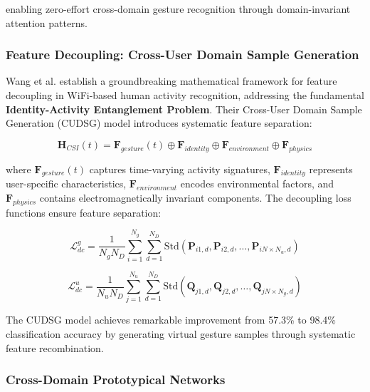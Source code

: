 \documentclass[journal]{IEEEtran}
\begin{document}
{enabling zero-effort cross-domain gesture recognition through domain-invariant attention patterns.

\subsubsection{Feature Decoupling: Cross-User Domain Sample Generation}

Wang et al. \cite{wang2024feature} establish a groundbreaking mathematical framework for feature decoupling in WiFi-based human activity recognition, addressing the fundamental \textbf{Identity-Activity Entanglement Problem}. Their Cross-User Domain Sample Generation (CUDSG) model introduces systematic feature separation:

\begin{equation}
\mathbf{H}_{CSI}(t) = \mathbf{F}_{gesture}(t) \oplus \mathbf{F}_{identity} \oplus \mathbf{F}_{environment} \oplus \mathbf{F}_{physics}
\label{eq:feature_decomposition_wang}
\end{equation}

where $\mathbf{F}_{gesture}(t)$ captures time-varying activity signatures, $\mathbf{F}_{identity}$ represents user-specific characteristics, $\mathbf{F}_{environment}$ encodes environmental factors, and $\mathbf{F}_{physics}$ contains electromagnetically invariant components. The decoupling loss functions ensure feature separation:

\begin{equation}
\mathcal{L}_{dc}^g = \frac{1}{N_g N_D} \sum_{i=1}^{N_g} \sum_{d=1}^{N_D} \text{Std}(\mathbf{P}_{i1,d}, \mathbf{P}_{i2,d}, \ldots, \mathbf{P}_{iN \times N_u,d})
\label{eq:gesture_decoupling_loss}
\end{equation}

\begin{equation}
\mathcal{L}_{dc}^u = \frac{1}{N_u N_D} \sum_{j=1}^{N_u} \sum_{d=1}^{N_D} \text{Std}(\mathbf{Q}_{j1,d}, \mathbf{Q}_{j2,d}, \ldots, \mathbf{Q}_{jN \times N_g,d})
\label{eq:identity_decoupling_loss}
\end{equation}

The CUDSG model achieves remarkable improvement from 57.3\% to 98.4\% classification accuracy by generating virtual gesture samples through systematic feature recombination.

\subsubsection{Cross-Domain Prototypical Networks}

}
\end{document}

